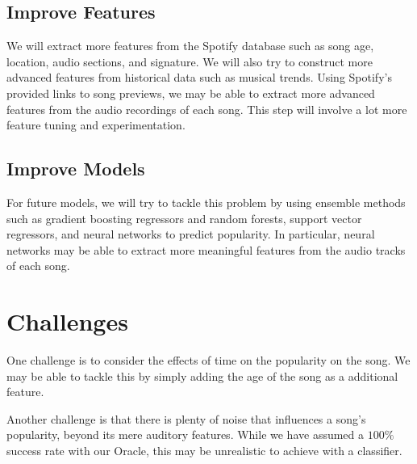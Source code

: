 \documentclass[journal]{IEEEtran}
\begin{document}
\subsection{Improve Features}
We will extract more features from the Spotify database such as song age, location, audio sections, and signature. We will also try to construct more advanced features from historical data such as musical trends. Using Spotify's provided links to song previews, we may be able to extract more advanced features from the audio recordings of each song. This step will involve a lot more feature tuning and experimentation.

\subsection{Improve Models}
For future models, we will try to tackle this problem by using ensemble methods such as gradient boosting regressors and random forests, support vector regressors, and neural networks to predict popularity. In particular, neural networks may be able to extract more meaningful features from the audio tracks of each song.

\section{Challenges}
One challenge is to consider the effects of time on the popularity on the song. We may be able to tackle this by simply adding the age of the song as a additional feature.

Another challenge is that there is plenty of noise that influences a song's popularity, beyond its mere auditory features. While we have assumed a $100\%$ success rate with our Oracle, this may be unrealistic to achieve with a classifier.


\end{document}
